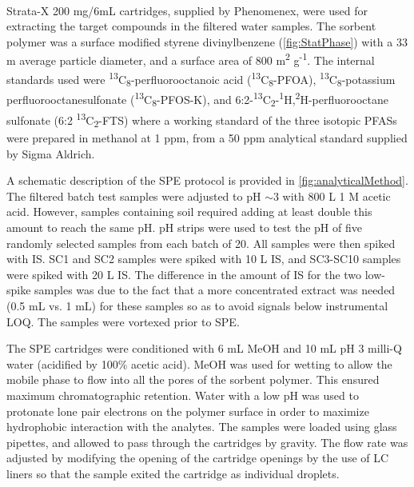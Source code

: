 Strata-X\textsuperscript{\textregistered} 200 mg/6mL cartridges, supplied by Phenomenex, were used for extracting the target compounds in the filtered water samples. The sorbent polymer was a surface modified styrene divinylbenzene (\cref{fig:StatPhase}) with a 33 \textmu m average particle diameter, and a surface area of 800 m\textsuperscript{2} g\textsuperscript{-1}. The internal standards used were \textsuperscript{13}C\textsubscript{8}-perfluorooctanoic acid (\textsuperscript{13}C\textsubscript{8}-PFOA), \textsuperscript{13}C\textsubscript{8}-potassium perfluorooctanesulfonate (\textsuperscript{13}C\textsubscript{8}-PFOS-K), and 6:2-\textsuperscript{13}C\textsubscript{2}-\textsuperscript{1}H,\textsuperscript{2}H-perfluorooctane sulfonate (6:2 \textsuperscript{13}C\textsubscript{2}-FTS) where a working standard of the three isotopic PFASs were prepared in methanol at 1 ppm, from a 50 ppm analytical standard supplied by Sigma Aldrich.

A schematic description of the SPE protocol is provided in \cref{fig:analyticalMethod}. The filtered batch test samples were adjusted to pH $\sim$3 with 800 \textmu L 1 M acetic acid. However, samples containing soil required adding at least double this amount to reach the same pH. pH strips were used to test the pH of five randomly selected samples from each batch of 20. All samples were then spiked with IS. SC1 and SC2 samples were spiked with 10 \textmu L IS, and SC3-SC10 samples were spiked with 20 \textmu L IS. The difference in the amount of IS for the two low-spike samples was due to the fact that a more concentrated extract was needed (0.5 mL vs. 1 mL) for these samples so as to avoid signals below instrumental \acrshort{LOQ}. The samples were vortexed prior to SPE.

The SPE cartridges were conditioned with 6 mL \acrshort{MeOH} and 10 mL pH 3 milli-Q water (acidified by 100\% acetic acid). MeOH was used for wetting to allow the mobile phase to flow into all the pores of the sorbent polymer. This ensured maximum chromatographic retention. Water with a low pH was used to protonate lone pair electrons on the polymer surface in order to maximize hydrophobic interaction with the analytes. The samples were loaded using glass pipettes, and allowed to pass through the cartridges by gravity. The flow rate was adjusted by modifying the opening of the cartridge openings by the use of LC liners so that the sample exited the cartridge as individual droplets.

